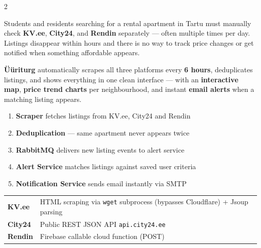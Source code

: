 \documentclass[12pt]{article}
\begin{document}
\setlength{\columnsep}{1.5cm}
\begin{multicols}{2}


\begin{tcolorbox}[posterbox={The Problem}]
  Students and residents searching for a rental apartment in Tartu must manually check
  \textbf{KV.ee}, \textbf{City24}, and \textbf{Rendin} separately — often multiple times
  per day. Listings disappear within hours and there is no way to track price changes
  or get notified when something affordable appears.
\end{tcolorbox}

\begin{tcolorbox}[posterbox={The Solution}]
  \textbf{Üüriturg} automatically scrapes all three platforms every \textbf{6 hours},
  deduplicates listings, and shows everything in one clean interface — with an
  \textbf{interactive map}, \textbf{price trend charts} per neighbourhood, and instant
  \textbf{email alerts} when a matching listing appears.
\end{tcolorbox}

\begin{tcolorbox}[posterbox={How It Works}]
  \begin{enumerate}[leftmargin=2cm, itemsep=5pt]
    \item \textbf{Scraper} fetches listings from KV.ee, City24 and Rendin
    \item \textbf{Deduplication} — same apartment never appears twice
    \item \textbf{RabbitMQ} delivers new listing events to alert service
    \item \textbf{Alert Service} matches listings against saved user criteria
    \item \textbf{Notification Service} sends email instantly via SMTP
  \end{enumerate}
\end{tcolorbox}

\begin{tcolorbox}[posterbox={Scraper Methods}]
  \begin{tabular}{>{\bfseries}p{3.5cm} p{10cm}}
    KV.ee    & HTML scraping via \texttt{wget} subprocess (bypasses Cloudflare) + Jsoup parsing \\[4pt]
    City24   & Public REST JSON API \texttt{api.city24.ee} \\[4pt]
    Rendin   & Firebase callable cloud function (POST) \\
  \end{tabular}
\end{tcolorbox}


\end{multicols}
\end{document}
